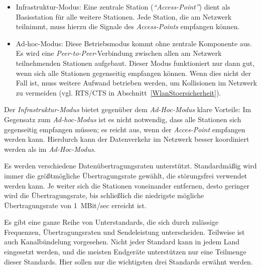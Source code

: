             \begin{itemize}
                \item{Infrastruktur-Modus:} Eine zentrale Station (\emph{"`Access-Point"'}) dient als Basisstation
                                            für alle weitere Stationen. Jede Station, die am Netzwerk
                                            teilnimmt, muss hierzu die Signale des \emph{Access-Points} 
                                            empfangen können.
                \item{Ad-hoc-Modus:} Diese Betriebsmodus kommt ohne zentrale Komponente aus. Es wird eine
                                     \emph{Peer-to-Peer}-Verbindung zwischen allen am Netzwerk teilnehmenden 
                                     Stationen aufgebaut. Dieser Modus funktioniert nur dann gut, wenn sich
                                     alle Stationen gegenseitig empfangen können. Wenn dies nicht der Fall ist,
                                     muss weitere Aufwand betrieben werden, um Kollisionen im Netzwerk zu
                                     vermeiden (vgl. RTS/CTS in Abschnitt~\ref{WlanStoersicherheit}).
                                     
            \end{itemize}

            Der \emph{Infrastruktur-Modus} bietet gegenüber dem \emph{Ad-Hoc-Modus} klare Vorteile: Im Gegensatz
            zum \emph{Ad-hoc-Modus} ist es nicht notwendig, dass alle Stationen sich gegenseitig empfangen
            müssen; es reicht aus, wenn der \emph{Acces-Point} empfangen werden kann. Hierdurch kann der
            Datenverkehr im Netzwerk besser koordiniert werden als im \emph{Ad-Hoc-Modus}. 

            Es werden verschiedene Datenübertragungsraten unterstützt. Standardmäßig wird
            immer die größtmögliche Übertragungsrate gewählt, die störungsfrei verwendet
            werden kann. Je weiter sich die Stationen voneinander entfernen, desto geringer
            wird die Übertragungsrate, bis schließlich die niedrigste mögliche Übertragungsrate von
            1~MBit/sec erreicht ist.

            Es gibt eine ganze Reihe von Unterstandards, die sich durch zulässige Frequenzen, 
            Übertragungsraten und Sendeleistung unterscheiden. Teilweise ist auch Kanalbündelung 
            vorgesehen. Nicht jeder Standard kann in jedem Land eingesetzt werden, und die meisten
            Endgeräte unterstützen nur eine Teilmenge dieser Standards. Hier sollen nur die
            wichtigsten drei Standards erwähnt werden.


